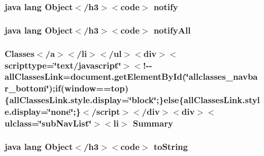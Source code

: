 \hypertarget{_graph_view_data_8html_ae99ae10b5010594dbda4794e02db271b}{
\subsubsection[{notify}]{\setlength{\rightskip}{0pt plus 5cm}java lang Object$<$/h3$>$$<$code$>$ notify}}\label{_graph_view_data_8html_ae99ae10b5010594dbda4794e02db271b}
\hypertarget{_graph_view_data_8html_a1279357e6e09e33e75b55eb05fdb6436}{
\subsubsection[{notify\-All}]{\setlength{\rightskip}{0pt plus 5cm}java lang Object$<$/h3$>$$<$code$>$ notify\-All}}\label{_graph_view_data_8html_a1279357e6e09e33e75b55eb05fdb6436}
\hypertarget{_graph_view_data_8html_a6f9ab45abc9b0679dc1b132fbacfc681}{
\subsubsection[{Summary}]{\setlength{\rightskip}{0pt plus 5cm}Classes$<$/{\bf a}$>$$<$/li$>$$<$/ul$>$$<$div$>$$<$scripttype=\char`\"{}text/javascript\char`\"{}$>$$<$!-\/-\/all\-Classes\-Link=document.\-get\-Element\-By\-Id(\char`\"{}allclasses\-\_\-navbar\-\_\-bottom\char`\"{});if(window==top)\{all\-Classes\-Link.\-style.\-display=\char`\"{}block\char`\"{};\}else\{all\-Classes\-Link.\-style.\-display=\char`\"{}none\char`\"{};\}$<$/script$>$$<$/div$>$$<$div$>$$<$ulclass=\char`\"{}sub\-Nav\-List\char`\"{}$>$$<$li$>$ Summary}}\label{_graph_view_data_8html_a6f9ab45abc9b0679dc1b132fbacfc681}
\hypertarget{_graph_view_data_8html_a36e8a76a4132c9a7081416f27d087615}{
\subsubsection[{to\-String}]{\setlength{\rightskip}{0pt plus 5cm}java lang Object$<$/h3$>$$<$code$>$ to\-String}}\label{_graph_view_data_8html_a36e8a76a4132c9a7081416f27d087615}
